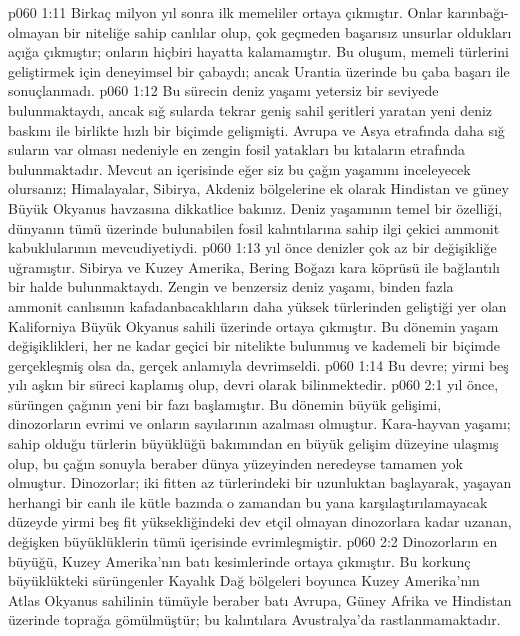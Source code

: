 \vs p060 1:11 Birkaç milyon yıl sonra ilk memeliler ortaya çıkmıştır. Onlar karınbağı\hyp{}olmayan bir niteliğe sahip canlılar olup, çok geçmeden başarısız unsurlar oldukları açığa çıkmıştır; onların hiçbiri hayatta kalamamıştır. Bu oluşum, memeli türlerini geliştirmek için deneyimsel bir çabaydı; ancak Urantia üzerinde bu çaba başarı ile sonuçlanmadı.
\vs p060 1:12 Bu sürecin deniz yaşamı yetersiz bir seviyede bulunmaktaydı, ancak sığ sularda tekrar geniş sahil şeritleri yaratan yeni deniz baskını ile birlikte hızlı bir biçimde gelişmişti. Avrupa ve Asya etrafında daha sığ suların var olması nedeniyle en zengin fosil yatakları bu kıtaların etrafında bulunmaktadır. Mevcut an içerisinde eğer siz bu çağın yaşamını inceleyecek olursanız; Himalayalar, Sibirya, Akdeniz bölgelerine ek olarak Hindistan ve güney Büyük Okyanus havzasına dikkatlice bakınız. Deniz yaşamının temel bir özelliği, dünyanın tümü üzerinde bulunabilen fosil kalıntılarına sahip ilgi çekici ammonit kabuklularının mevcudiyetiydi.
\vs p060 1:13  yıl önce denizler çok az bir değişikliğe uğramıştır. Sibirya ve Kuzey Amerika, Bering Boğazı kara köprüsü ile bağlantılı bir halde bulunmaktaydı. Zengin ve benzersiz deniz yaşamı, binden fazla ammonit canlısının kafadanbacaklıların daha yüksek türlerinden geliştiği yer olan Kaliforniya Büyük Okyanus sahili üzerinde ortaya çıkmıştır. Bu dönemin yaşam değişiklikleri, her ne kadar geçici bir nitelikte bulunmuş ve kademeli bir biçimde gerçekleşmiş olsa da, gerçek anlamıyla devrimseldi.
\vs p060 1:14 Bu devre; yirmi beş yılı aşkın bir süreci kaplamış olup,  devri olarak bilinmektedir.
\vs p060 2:1  yıl önce, sürüngen çağının yeni bir fazı başlamıştır. Bu dönemin büyük gelişimi, dinozorların evrimi ve onların sayılarının azalması olmuştur. Kara\hyp{}hayvan yaşamı; sahip olduğu türlerin büyüklüğü bakımından en büyük gelişim düzeyine ulaşmış olup, bu çağın sonuyla beraber dünya yüzeyinden neredeyse tamamen yok olmuştur. Dinozorlar; iki fitten az türlerindeki bir uzunluktan başlayarak, yaşayan herhangi bir canlı ile kütle bazında o zamandan bu yana karşılaştırılamayacak düzeyde yirmi beş fit yüksekliğindeki dev etçil olmayan dinozorlara kadar uzanan, değişken büyüklüklerin tümü içerisinde evrimleşmiştir.
\vs p060 2:2 Dinozorların en büyüğü, Kuzey Amerika’nın batı kesimlerinde ortaya çıkmıştır. Bu korkunç büyüklükteki sürüngenler Kayalık Dağ bölgeleri boyunca Kuzey Amerika’nın Atlas Okyanus sahilinin tümüyle beraber batı Avrupa, Güney Afrika ve Hindistan üzerinde toprağa gömülmüştür; bu kalıntılara Avustralya’da rastlanmamaktadır.
